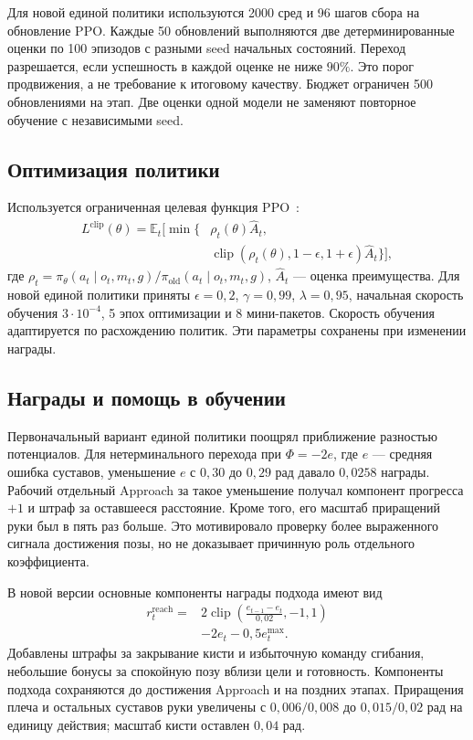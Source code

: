 \documentclass{misisarticle}
\begin{document}
Для новой единой политики используются 2000 сред и 96 шагов сбора на обновление PPO. Каждые 50 обновлений выполняются две детерминированные оценки по 100 эпизодов с разными seed начальных состояний. Переход разрешается, если успешность в каждой оценке не ниже $90\%$. Это порог продвижения, а не требование к итоговому качеству. Бюджет ограничен 500 обновлениями на этап. Две оценки одной модели не заменяют повторное обучение с независимыми seed.

\subsection{Оптимизация политики}
Используется ограниченная целевая функция PPO~\cite{ppo}:
\begin{equation}
\begin{split}
 L^{\mathrm{clip}}(\theta)=\mathbb{E}_t\bigl[\min\{&\rho_t(\theta)\hat A_t,\\
 &\operatorname{clip}(\rho_t(\theta),1-\epsilon,1+\epsilon)\hat A_t\}\bigr],
\end{split}
\end{equation}
где $\rho_t=\pi_\theta(a_t\mid o_t,m_t,g)/\pi_{\mathrm{old}}(a_t\mid o_t,m_t,g)$, $\hat A_t$ --- оценка преимущества. Для новой единой политики приняты $\epsilon=0{,}2$, $\gamma=0{,}99$, $\lambda=0{,}95$, начальная скорость обучения $3\cdot10^{-4}$, 5 эпох оптимизации и 8 мини-пакетов. Скорость обучения адаптируется по расхождению политик. Эти параметры сохранены при изменении награды.

\subsection{Награды и помощь в обучении}
Первоначальный вариант единой политики поощрял приближение разностью потенциалов. Для нетерминального перехода при $\Phi=-2e$, где $e$ --- средняя ошибка суставов, уменьшение $e$ с $0{,}30$ до $0{,}29$ рад давало $0{,}0258$ награды. Рабочий отдельный Approach за такое уменьшение получал компонент прогресса $+1$ и штраф за оставшееся расстояние. Кроме того, его масштаб приращений руки был в пять раз больше. Это мотивировало проверку более выраженного сигнала достижения позы, но не доказывает причинную роль отдельного коэффициента.

В новой версии основные компоненты награды подхода имеют вид
\begin{equation}
\begin{split}
 r^{\mathrm{reach}}_t={}&2\operatorname{clip}\!\left(\frac{e_{t-1}-e_t}{0{,}02},-1,1\right)\\
 &-2e_t-0{,}5e_t^{\max}.
\end{split}
\end{equation}
Добавлены штрафы за закрывание кисти и избыточную команду сгибания, небольшие бонусы за спокойную позу вблизи цели и готовность. Компоненты подхода сохраняются до достижения Approach и на поздних этапах. Приращения плеча и остальных суставов руки увеличены с $0{,}006/0{,}008$ до $0{,}015/0{,}02$ рад на единицу действия; масштаб кисти оставлен $0{,}04$ рад.
\end{document}
